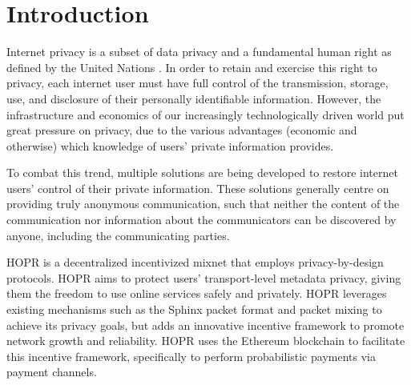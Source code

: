 
\section{Introduction}
\label{sec:introduction}

Internet privacy is a subset of data privacy and a fundamental human right as defined by the United Nations \cite{un2018}. In order to retain and exercise this right to privacy, each internet user must have full control of the transmission, storage, use, and disclosure of their personally identifiable information. However, the infrastructure and economics of our increasingly technologically driven world put great pressure on privacy, due to the various advantages (economic and otherwise) which knowledge of users' private information provides.

To combat this trend, multiple solutions are being developed to restore internet users' control of their private information. These solutions generally centre on providing truly anonymous communication, such that neither the content of the communication nor information about the communicators can be discovered by anyone, including the communicating parties.

HOPR is a decentralized incentivized mixnet \cite{mixnets} that employs privacy-by-design protocols. HOPR aims to protect users' transport-level metadata privacy, giving them the freedom to use online services safely and privately. HOPR leverages existing mechanisms such as the Sphinx packet format \cite{sphinxpaper} and packet mixing to achieve its privacy goals, but adds an innovative incentive framework to promote network growth and reliability. HOPR uses the Ethereum blockchain \cite{ethereum} to facilitate this incentive framework, specifically to perform probabilistic payments via payment channels.